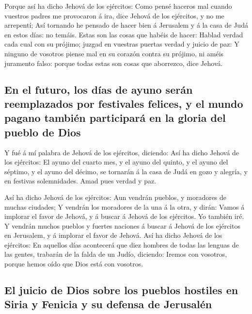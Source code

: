  Porque así ha dicho Jehová de los ejércitos: Como pensé
haceros mal cuando vuestros padres me provocaron á ira, dice Jehová de
los ejércitos, y no me arrepentí;  Así tornando he
pensado de hacer bien á Jerusalem y á la casa de Judá en estos días: no
temáis.  Estas son las cosas que habéis de hacer: Hablad
verdad cada cual con su prójimo; juzgad en vuestras puertas verdad y
juicio de paz:  Y ninguno de vosotros piense mal en su
corazón contra su prójimo, ni améis juramento falso: porque todas estas
son cosas que aborrezco, dice Jehová.

\hypertarget{en-el-futuro-los-duxedas-de-ayuno-seruxe1n-reemplazados-por-festivales-felices-y-el-mundo-pagano-tambiuxe9n-participaruxe1-en-la-gloria-del-pueblo-de-dios}{%
\subsection{En el futuro, los días de ayuno serán reemplazados por
festivales felices, y el mundo pagano también participará en la gloria
del pueblo de
Dios}\label{en-el-futuro-los-duxedas-de-ayuno-seruxe1n-reemplazados-por-festivales-felices-y-el-mundo-pagano-tambiuxe9n-participaruxe1-en-la-gloria-del-pueblo-de-dios}}

 Y fué á mí palabra de Jehová de los ejércitos, diciendo:
 Así ha dicho Jehová de los ejércitos: El ayuno del
cuarto mes, y el ayuno del quinto, y el ayuno del séptimo, y el ayuno
del décimo, se tornarán á la casa de Judá en gozo y alegría, y en
festivas solemnidades. Amad pues verdad y paz.

 Así ha dicho Jehová de los ejércitos: Aun vendrán
pueblos, y moradores de muchas ciudades;  Y vendrán los
moradores de la una á la otra, y dirán: Vamos á implorar el favor de
Jehová, y á buscar á Jehová de los ejércitos. Yo también iré.
 Y vendrán muchos pueblos y fuertes naciones á buscar á
Jehová de los ejércitos en Jerusalem, y á implorar el favor de Jehová.
 Así ha dicho Jehová de los ejércitos: En aquellos días
acontecerá que diez hombres de todas las lenguas de las gentes, trabarán
de la falda de un Judío, diciendo: Iremos con vosotros, porque hemos
oído que Dios está con vosotros.

\hypertarget{el-juicio-de-dios-sobre-los-pueblos-hostiles-en-siria-y-fenicia-y-su-defensa-de-jerusaluxe9n}{%
\subsection{El juicio de Dios sobre los pueblos hostiles en Siria y
Fenicia y su defensa de
Jerusalén}\label{el-juicio-de-dios-sobre-los-pueblos-hostiles-en-siria-y-fenicia-y-su-defensa-de-jerusaluxe9n}}

